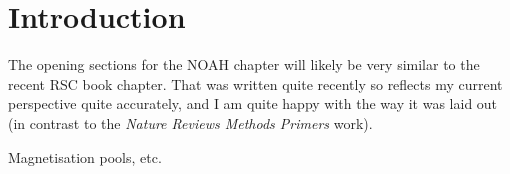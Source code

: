 \section{Introduction}
\label{sec:noah__introduction}

The opening sections for the NOAH chapter will likely be very similar to the recent RSC book chapter.
That was written quite recently so reflects my current perspective quite accurately, and I am quite happy with the way it was laid out (in contrast to the \textit{Nature Reviews Methods Primers} work).

Magnetisation pools, etc.
